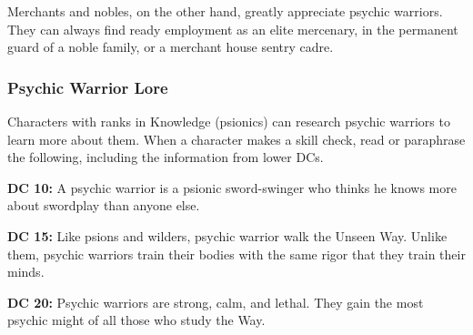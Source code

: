 Merchants and nobles, on the other hand, greatly appreciate psychic warriors. They can always find ready employment as an elite mercenary, in the permanent guard of a noble family, or a merchant house sentry cadre.

\subsubsection{Psychic Warrior Lore}

Characters with ranks in Knowledge (psionics) can research psychic warriors to learn more about them. When a character makes a skill check, read or paraphrase the following, including the information from lower DCs.

\textbf{DC 10:} A psychic warrior is a psionic sword-swinger who thinks he knows more about swordplay than anyone else.

\textbf{DC 15:} Like psions and wilders, psychic warrior walk the Unseen Way. Unlike them, psychic warriors train their bodies with the same rigor that they train their minds.

\textbf{DC 20:} Psychic warriors are strong, calm, and lethal. They gain the most psychic might of all those who study the Way.
